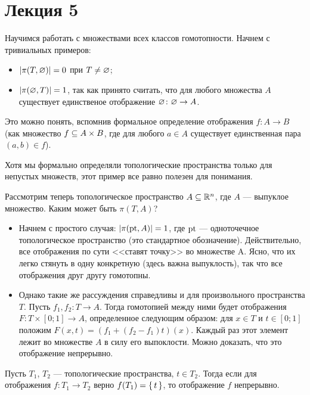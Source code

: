 \documentclass[main]{subfiles}
\begin{document}
\section{Лекция 5}

Научимся работать с множествами всех классов гомотопности. Начнем с тривиальных примеров:
\begin{itemize}
	\item $ \left\vert\pi(T, \varnothing)\right\vert = 0 $ при $ T \neq \varnothing $;
	\item $ \left\vert\pi(\varnothing, T)\right\vert = 1 $, так как принято считать, что для любого множества $ A $ существует
		единственое отображение $ \varnothing \colon \varnothing \to A $.
\end{itemize}
Это можно понять, вспомнив формальное определение отображения $ f \colon A \to B $
(как множество $ f \subseteq A \times B $, где для любого $ a \in A $ существует единственная пара $ (a, b) \in f $).

\begin{remark}
	Хотя мы формально определяли топологические пространства только для непустых множеств, этот пример все равно
	полезен для понимания.
\end{remark}

Рассмотрим теперь топологическое пространство $ A \subseteq \mathbb{R}^n $, где $ A $ --- выпуклое множество.
Каким может быть $ \pi(T, A) $?
\begin{itemize}
	\item Начнем с простого случая: $ \left\vert\pi(\operatorname{pt}, A)\right\vert = 1 $, где $ \operatorname{pt} $ --- одноточечное топологическое пространство
		(это стандартное обозначение). Действительно, все отображения по сути <<ставят точку>>
		во множестве A. Ясно, что их легко стянуть в одну конкретную (здесь важна выпуклость), так что все отображения
		друг другу гомотопны.
	\item Однако такие же рассуждения справедливы и для произвольного пространства $ T $. Пусть
		$ f_1, f_2 \colon T \to A $. Тогда гомотопией между ними будет отображения
		$ F \colon T \times [0; 1] \to A $, определенное следующим образом: для $ x \in T $ и
		$ t \in [0; 1] $ положим $ F(x, t) = (f_1 + (f_2 - f_1) t)(x) $. Каждый раз этот элемент лежит
		во множестве $ A $ в силу его выпоклости. Можно доказать, что это отображение непрерывно.
\end{itemize}

\begin{theorem}
	Пусть $ T_1 $, $ T_2 $ --- топологические пространства, $ t \in T_2 $. Тогда если для отображения
	$ f \colon T_1 \to T_2 $ верно $ f(T_1) = \left\{\,t\,\right\} $, то отображение $ f $ непрерывно.
\end{theorem}
\end{document}
